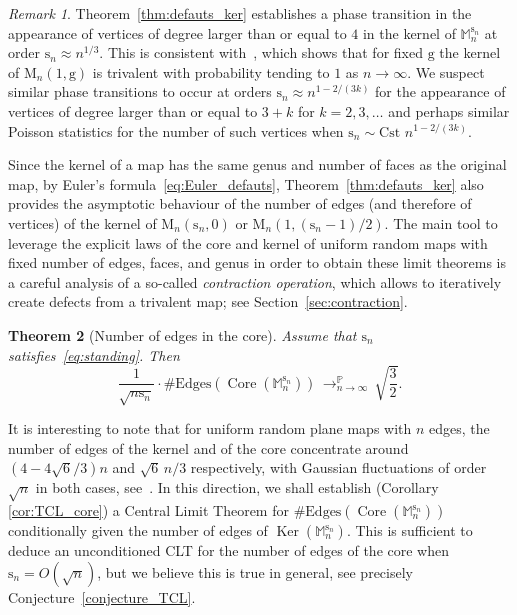 \documentclass[11pt]{article}
\theoremstyle{plain}
\newtheorem{theorem}{Theorem}
\theoremstyle{definition}
\theoremstyle{remark}
\newtheorem{remark}[theorem]{Remark}
\renewcommand{\P}{\mathbb{P}}
\newcommand{\Map}{\mathrm{M}}
\newcommand{\Mapb}{\mathbb{M}}
\newcommand{\gen}{\mathrm{g}}
\newcommand{\spar}{\mathrm{s}}
\DeclareMathOperator{\Core}{Core}
\DeclareMathOperator{\Ker}{Ker}
\newcommand{\cvproba}[1][n]{\,\mathop{\longrightarrow}^{\P}_{#1 \to \infty}\,}
\begin{document}
\begin{remark}
Theorem~\ref{thm:defauts_ker} establishes a phase transition in the appearance of vertices of degree larger than or equal to $4$ in the kernel of $ \Mapb_n^{\spar_n}$ at order $ \spar_n \approx n^{1/3}$. This is consistent with~\cite[Lem.\,3]{Cha10}, which shows that for fixed $\gen$ the kernel of $ \Map_{n}(1,\gen)$ is trivalent with probability tending to $1$ as $n \rightarrow \infty$. We suspect similar phase transitions to occur at orders $ \spar_n \approx n^{1- 2/(3k)}$ for the appearance of vertices of degree larger than or equal to $3+k$ for $k = 2,3, \dots$ and perhaps similar Poisson statistics for the number of such vertices when $ \spar_n \sim \text{Cst } n^{1- 2/(3k)}$.
\end{remark}

Since the kernel of a map has the same genus and number of faces as the original map, by Euler's formula~\eqref{eq:Euler_defauts}, Theorem~\ref{thm:defauts_ker} also provides the asymptotic behaviour of the number of edges (and therefore of vertices) of the kernel of $ \Map_{n}(\spar_{n},0)$ or \hbox{$\Map_{n}(1, (\spar_{n}-1)/2)$}.
The main tool to leverage the explicit laws of the core and kernel of uniform random maps with fixed number of edges, faces, and genus in order to obtain these limit theorems is a careful analysis of a so-called \emph{contraction operation}, which allows to iteratively create defects from a trivalent map; see Section~\ref{sec:contraction}.

\begin{theorem}[Number of edges in the core]
\label{thm:aretes_core}
Assume that $\spar_n$ satisfies~\eqref{eq:standing}.
Then
\[
\frac{1}{\sqrt{n\spar_n}} \cdot \#\mathrm{Edges}(\Core(\Mapb_n^{\spar_{n}})) \cvproba \sqrt{\frac{3}{2}}.
\]
\end{theorem}

It is interesting to note that for uniform random plane maps with $n$ edges, the number of edges of the kernel and of the core concentrate around $(4-4 \sqrt{6}/3)n$ and $\sqrt{6}\,n/3$ respectively, with Gaussian fluctuations of order $\sqrt{n}$ in both cases, see~\cite[Th.\,5]{NR18}. In this direction, we shall establish (Corollary \ref{cor:TCL_core}) a Central Limit Theorem for $\#\mathrm{Edges}(\Core(\Mapb_n^{\spar_{n}}))$ conditionally given the number of edges of $\Ker(\Mapb_n^{\spar_{n}})$.
This is sufficient to deduce an unconditioned CLT for the number of edges of the core when $\spar_n = O(\sqrt{n})$, but we believe this is true in general, see precisely Conjecture~\ref{conjecture_TCL}.
\end{document}
